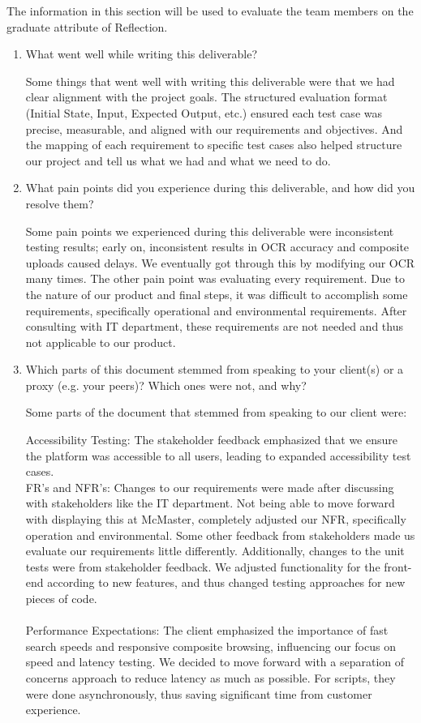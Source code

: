 \documentclass[12pt, titlepage]{article}
\begin{document}
The information in this section will be used to evaluate the team members on the
graduate attribute of Reflection.



\begin{enumerate}
  \item What went well while writing this deliverable?

 Some things that went well with writing this deliverable were that we had clear alignment with the project goals. The structured evaluation format (Initial State, Input, Expected Output, etc.) ensured each test case was precise, measurable, and aligned with our requirements and objectives. And the mapping of each requirement to specific test cases also helped structure our project and tell us what we had and what we need to do.
  
  \item What pain points did you experience during this deliverable, and how
    did you resolve them?

    Some pain points we experienced during this deliverable were inconsistent testing results; early on, inconsistent results in OCR accuracy and composite uploads caused delays. We eventually got through this by modifying our OCR many times. The other pain point was evaluating every requirement. Due to the nature of our product and final steps, it was difficult to accomplish some requirements, specifically operational and environmental requirements. After consulting with IT department, these requirements are not needed and thus not applicable to our product.

  \item Which parts of this document stemmed from speaking to your client(s) or
  a proxy (e.g. your peers)? Which ones were not, and why?
  
  Some parts of the document that stemmed from speaking to our client were:
  
  Accessibility Testing: The stakeholder feedback emphasized that we ensure the platform was accessible to all users, leading to expanded accessibility test cases.\\
  
FR’s and NFR’s: Changes to our requirements were made after discussing with stakeholders like the IT department. Not being able to move forward with displaying this at McMaster, completely adjusted our NFR, specifically operation and environmental. Some other feedback from stakeholders made us evaluate our requirements little differently. Additionally, changes to the unit tests were from stakeholder feedback. We adjusted functionality for the front-end according to new features, and thus changed testing approaches for new pieces of code.\\
\\Performance Expectations: The client emphasized the importance of fast search speeds and responsive composite browsing, influencing our focus on speed and latency testing. We decided to move forward with a separation of concerns approach to reduce latency as much as possible. For scripts, they were done asynchronously, thus saving significant time from customer experience.\\


\end{enumerate}
\end{document}
